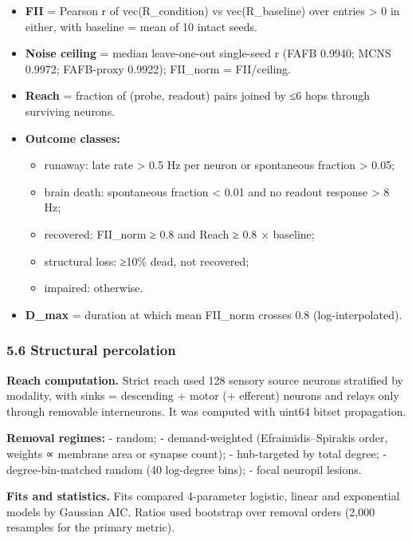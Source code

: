 \documentclass[11pt]{article}
\providecommand{\tightlist}{\setlength{\itemsep}{0pt}\setlength{\parskip}{0pt}}
\begin{document}
\begin{itemize}
\tightlist
\item
  \textbf{FII} = Pearson r of vec(R\_condition) vs vec(R\_baseline) over entries \textgreater{} 0 in either, with baseline = mean of 10 intact seeds.
\item
  \textbf{Noise ceiling} = median leave-one-out single-seed r (FAFB 0.9940; MCNS 0.9972; FAFB-proxy 0.9922); FII\_norm = FII/ceiling.
\item
  \textbf{Reach} = fraction of (probe, readout) pairs joined by ≤6 hops through surviving neurons.
\item
  \textbf{Outcome classes:}

  \begin{itemize}
  \tightlist
  \item
    runaway: late rate \textgreater{} 0.5 Hz per neuron or spontaneous fraction \textgreater{} 0.05;
  \item
    brain death: spontaneous fraction \textless{} 0.01 and no readout response \textgreater{} 8 Hz;
  \item
    recovered: FII\_norm ≥ 0.8 and Reach ≥ 0.8 × baseline;
  \item
    structural loss: ≥10\% dead, not recovered;
  \item
    impaired: otherwise.
  \end{itemize}
\item
  \textbf{D\_max} = duration at which mean FII\_norm crosses 0.8 (log-interpolated).
\end{itemize}

\subsubsection{5.6 Structural percolation}\label{structural-percolation}

\textbf{Reach computation.} Strict reach used 128 sensory source neurons stratified by modality, with sinks = descending + motor (+ efferent) neurons and relays only through removable interneurons. It was computed with uint64 bitset propagation.

\textbf{Removal regimes:}
- random;
- demand-weighted (Efraimidis--Spirakis order, weights ∝ membrane area or synapse count);
- hub-targeted by total degree;
- degree-bin-matched random (40 log-degree bins);
- focal neuropil lesions.

\textbf{Fits and statistics.} Fits compared 4-parameter logistic, linear and exponential models by Gaussian AIC. Ratios used bootstrap over removal orders (2,000 resamples for the primary metric).
\end{document}
